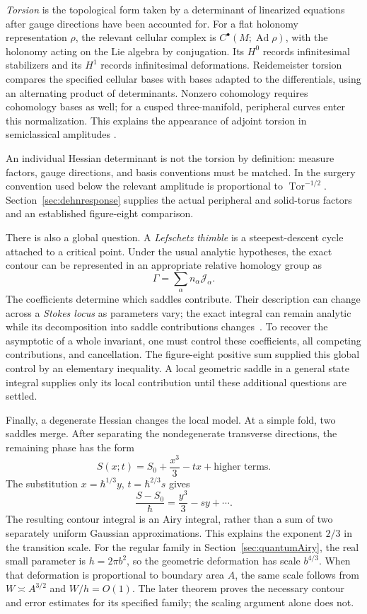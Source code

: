 \documentclass[11pt,a4paper]{article}
\numberwithin{equation}{section}
\theoremstyle{definition}
\theoremstyle{remark}
\begin{document}
\emph{Torsion} is the topological form taken by a determinant of
linearized equations after gauge directions have been accounted
for. For a flat holonomy representation $\rho$, the relevant
cellular complex is $C^\bullet(M;\operatorname{Ad}\rho)$, with the
holonomy acting on the Lie algebra by conjugation.
Its $H^0$ records infinitesimal stabilizers and its $H^1$ records
infinitesimal deformations. Reidemeister torsion compares the
specified cellular bases with bases adapted to the differentials,
using an alternating product of determinants. Nonzero cohomology
requires cohomology bases as well; for a cusped three-manifold,
peripheral curves enter this normalization. This explains the
appearance of adjoint torsion in semiclassical amplitudes
\cite{WittenJones,DimofteGaroufalidis}.

An individual Hessian determinant is not the torsion by definition:
measure factors, gauge directions, and basis conventions must be
matched. In the surgery convention used below the relevant
amplitude is proportional to $\operatorname{Tor}^{-1/2}$.
Section~\ref{sec:dehnresponse} supplies the actual peripheral and
solid-torus factors and an established figure-eight comparison.

There is also a global question. A \emph{Lefschetz thimble} is a
steepest-descent cycle attached to a critical point. Under the
usual analytic hypotheses, the exact contour can be represented
in an appropriate relative homology group as
\[
 \Gamma=\sum_\alpha n_\alpha\mathcal J_\alpha.
\]
The coefficients determine which saddles contribute. Their
description can change across a \emph{Stokes locus} as parameters
vary; the exact integral can remain analytic while its decomposition
into saddle contributions changes~\cite[Sections 2--3]{WittenContinuation}.
To recover the asymptotic of a whole invariant, one must control
these coefficients, all competing contributions, and cancellation.
The figure-eight positive sum supplied this global control by an
elementary inequality. A local geometric saddle in a general
state integral supplies only its local contribution until these
additional questions are settled.

Finally, a degenerate Hessian changes the local model. At a simple
fold, two saddles merge. After separating the nondegenerate
transverse directions, the remaining phase has the form
\[
 S(x;t)=S_0+\frac{x^3}{3}-tx+\text{higher terms}.
\]
The substitution $x=\hbar^{1/3}y$, $t=\hbar^{2/3}s$ gives
\[
 \frac{S-S_0}{\hbar}=\frac{y^3}{3}-sy+\cdots.
\]
The resulting contour integral is an Airy integral, rather than
a sum of two separately uniform Gaussian approximations. This
explains the exponent $2/3$ in the transition scale. For the regular
family in Section~\ref{sec:quantumAiry}, the real small parameter
is $h=2\pi b^2$, so the geometric deformation has scale
$b^{4/3}$. When that deformation is proportional to boundary area
$A$, the same scale follows from $W\asymp A^{3/2}$ and $W/h=O(1)$.
The later theorem proves the necessary contour and error estimates
for its specified family; the scaling argument alone does not.
\end{document}
